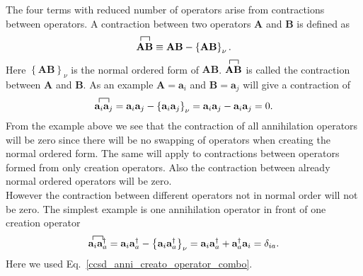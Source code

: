 \documentclass[a4paper,norsk,11pt,twoside]{report}
\begin{document}
The four terms with reduced number of operators arise from
contractions between operators. A contraction between two operators
$\textbf{A}$ and $\textbf{B}$ is defined as
\begin{equation}
\contraction{}{\textbf{A}}{}{\textbf{B}}
\textbf{A}\textbf{B}
 \equiv \textbf{A}\textbf{B} - \left\{ \textbf{A}\textbf{B} \right\}_{\nu} .
\end{equation}
Here $\left\{ \textbf{A}\textbf{B} \right\}_{\nu}$ is the normal
ordered form of
$\textbf{A}\textbf{B}$. $\contraction{}{\textbf{A}}{}{\textbf{B}}
\textbf{A}\textbf{B}$ is called the contraction between $\textbf{A}$
and $\textbf{B}$. As an example $\textbf{A} = \textbf{a}_i$ and
$\textbf{B} = \textbf{a}_j$ will give a contraction of
\begin{equation}
\contraction{}{\textbf{a}_i}{}{\textbf{a}_j}
\textbf{a}_i\textbf{a}_j
= \textbf{a}_i \textbf{a}_j - \left\{ \textbf{a}_i \textbf{a}_j \right\}_{\nu} = \textbf{a}_i \textbf{a}_j - \textbf{a}_i \textbf{a}_j = 0 . \label{wickexample1}
\end{equation}
From the example above we see that the contraction of all annihilation
operators will be zero since there will be no swapping of operators
when creating the normal ordered form. The same will apply to
contractions between operators formed from only creation
operators. Also the contraction between already normal ordered
operators will be zero. \\

However the contraction between different operators not in normal
order will not be zero. The simplest example is one annihilation
operator in front of one creation operator
\begin{equation}
\contraction{}{\textbf{a}_i}{}{\textbf{a}^{\dag}_a}
\textbf{a}_i\textbf{a}^{\dag}_a
= \textbf{a}_i \textbf{a}^{\dag}_a - \left\{ \textbf{a}_i \textbf{a}^{\dag}_a \right\}_{\nu} = \textbf{a}_i \textbf{a}^{\dag}_a + \textbf{a}^{\dag}_a \textbf{a}_i = \delta_{ia} .
\end{equation}
Here we used Eq.~\eqref{ccsd_anni_creato_operator_combo}.
\end{document}
